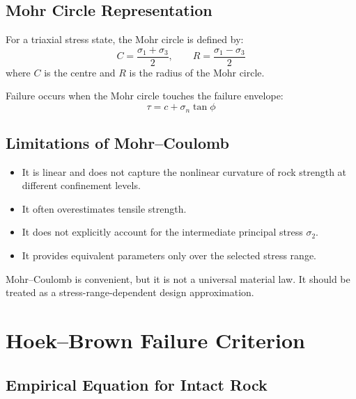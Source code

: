 \documentclass[a4paper,12pt]{article}
\begin{document}
\subsection{Mohr Circle Representation}

For a triaxial stress state, the Mohr circle is defined by:
\[
C = \frac{\sigma_1+\sigma_3}{2},
\qquad
R = \frac{\sigma_1-\sigma_3}{2}
\]
where \(C\) is the centre and \(R\) is the radius of the Mohr circle.

Failure occurs when the Mohr circle touches the failure envelope:
\[
\tau = c + \sigma_n \tan\phi
\]

\subsection{Limitations of Mohr--Coulomb}

\begin{itemize}
    \item It is linear and does not capture the nonlinear curvature of rock strength at
    different confinement levels.
    \item It often overestimates tensile strength.
    \item It does not explicitly account for the intermediate principal stress \(\sigma_2\).
    \item It provides equivalent parameters only over the selected stress range.
\end{itemize}

\begin{warnbox}
Mohr--Coulomb is convenient, but it is not a universal material law. It should be treated
as a stress-range-dependent design approximation.
\end{warnbox}

\section{Hoek--Brown Failure Criterion}

\subsection{Empirical Equation for Intact Rock}
\end{document}
